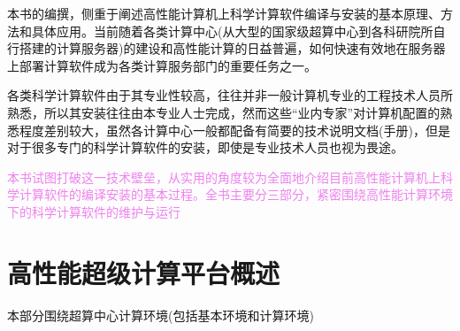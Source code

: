 \documentclass{article}      %
\begin{document}


本书的编撰，侧重于阐述高性能计算机上科学计算软件编译与安装的基本原理、方法和具体应用。当前随着各类计算中心(从大型的国家级超算中心到各科研院所自行搭建的计算服务器)的建设和高性能计算的日益普遍，如何快速有效地在服务器上部署计算软件成为各类计算服务部门的重要任务之一。

各类科学计算软件由于其专业性较高，往往并非一般计算机专业的工程技术人员所熟悉，所以其安装往往由本专业人士完成，然而这些“业内专家”对计算机配置的熟悉程度差别较大，虽然各计算中心一般都配备有简要的技术说明文档(手册)，但是对于很多专门的科学计算软件的安装，即使是专业技术人员也视为畏途。

\textcolor{violet}{本书试图打破这一技术壁垒，从实用的角度较为全面地介绍目前高性能计算机上科学计算软件的编译安装的基本过程。全书主要分三部分，紧密围绕高性能计算环境下的科学计算软件的维护与运行}
\section{高性能超级计算平台概述}
本部分围绕超算中心计算环境(包括基本环境和计算环境)
\end{document}
